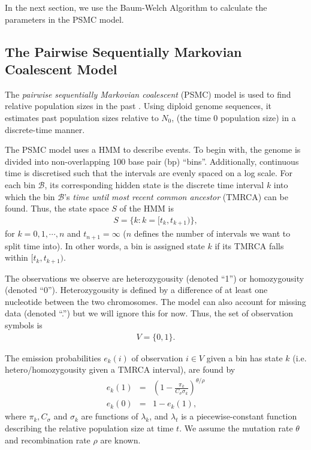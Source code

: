 \documentclass[12pt]{article}
\newcommand{\B}{\mathcal B}
\begin{document}
In the next section, we use the Baum-Welch Algorithm to calculate the parameters in the PSMC model.

\subsection{The Pairwise Sequentially Markovian Coalescent Model}\label{ssec:PSMC}
The \emph{pairwise sequentially Markovian coalescent} (PSMC) model is used to find relative population sizes in the past \cite{li2011inference}. Using diploid genome sequences, it estimates past population sizes relative to $N_0$, (the time 0 population size) in a discrete-time manner.

The PSMC model uses a HMM to describe events. To begin with, the genome is divided into non-overlapping 100 base pair (bp) ``bins''. Additionally, continuous time is discretised such that the intervals are evenly spaced on a log scale. For each bin $\B$, its corresponding hidden state is the discrete time interval $k$ into which the bin $\B$'s \emph{time until most recent common ancestor} (TMRCA) can be found. Thus, the state space $S$ of the HMM is
\begin{eqnarray}
  S= \{k : k=[t_k,t_{k+1}) \},
\end{eqnarray}
for $k=0,1,\cdots,n$ and $t_{n+1}=\infty$ ($n$ defines the number of intervals we want to split time into). In other words, a bin is assigned state $k$ if its TMRCA falls within $[t_k,t_{k+1})$.

  The observations we observe are heterozygousity (denoted ``1'') or homozygousity (denoted ``0''). Heterozygousity is defined by a difference of at least one nucleotide between the two chromosomes. The model can also account for missing data (denoted ``.'') but we will ignore this for now. Thus, the set of observation symbols is
\begin{eqnarray}
  V= \{0,1 \}.
\end{eqnarray}

The emission probabilities $e_k(i)$ of observation $i\in V$ given a bin has state $k$ (i.e. hetero/homozygousity given a TMRCA interval), are found by
\begin{eqnarray}
  e_k(1)&=&\left(1-\frac{\pi_k}{C_\sigma\sigma_k} \right)^{\theta/\rho}\\
  e_k(0)&=&1-e_k(1),
\end{eqnarray}
where $\pi_k, C_\sigma$ and $\sigma_k$ are functions of $\lambda_k$, and $\lambda_t$ is a piecewise-constant function describing the relative population size at time $t$. We assume the mutation rate $\theta$ and recombination rate $\rho$ are known.
\end{document}
